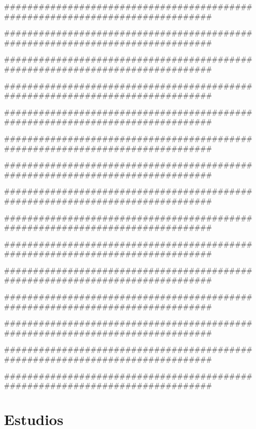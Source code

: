###############################################################################

###############################################################################

###############################################################################

###############################################################################

###############################################################################

###############################################################################

###############################################################################

###############################################################################

###############################################################################

###############################################################################

###############################################################################

###############################################################################

###############################################################################

###############################################################################

###############################################################################

\chapter{Estudios}